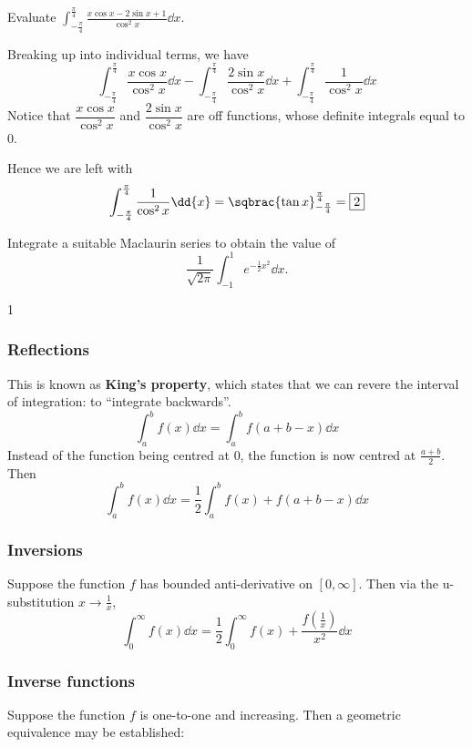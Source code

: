 \begin{exercise}
Evaluate $\displaystyle\int_{-\frac{\pi}{4}}^\frac{\pi}{4}\frac{x\cos x-2\sin x+1}{\cos^2x}\dd{x}$.
\end{exercise}
\begin{solution}
Breaking up into individual terms, we have
\[ \int_{-\frac{\pi}{4}}^\frac{\pi}{4}\frac{x\cos x}{\cos^2x}\dd{x}-\int_{-\frac{\pi}{4}}^\frac{\pi}{4}\frac{2\sin x}{\cos^2x}\dd{x}+\int_{-\frac{\pi}{4}}^\frac{\pi}{4}\frac{1}{\cos^2x}\dd{x} \]
Notice that $\dfrac{x\cos x}{\cos^2x}$ and $\dfrac{2\sin x}{\cos^2x}$ are off functions, whose definite integrals equal to $0$.

Hence we are left with 
\[ \int_{-\frac{\pi}{4}}^\frac{\pi}{4}\frac{1}{\cos^2x}\dd{x}=\sqbrac{\tan x}_{-\frac{\pi}{4}}^\frac{\pi}{4}=\boxed{2} \]
\end{solution}

\begin{exercise}
Integrate a suitable Maclaurin series to obtain the value of
\[ \frac{1}{\sqrt{2\pi}}\int_{-1}^1e^{-\frac{1}{2}x^2}\dd{x}. \]
\end{exercise}
\begin{solution}
1
\end{solution}

\subsubsection{Reflections}
This is known as \textbf{King's property}, which states that we can revere the interval of integration: to ``integrate backwards''.
\begin{equation}
\int_a^b f(x)\dd{x} = \int_a^b f(a+b-x)\dd{x}
\end{equation}
Instead of the function being centred at 0, the function is now centred at $\frac{a+b}{2}$. Then
\[ \int_a^b f(x)\dd{x} = \frac{1}{2} \int_a^b f(x) + f(a+b-x)\dd{x} \]

\subsubsection{Inversions}
Suppose the function $f$ has bounded anti-derivative on $[0,\infty]$. Then via the u-substitution $x\to\frac{1}{x}$,
\[ \int_0^\infty f(x)\dd{x} = \frac{1}{2}\int_0^\infty f(x) + \frac{f(\frac{1}{x})}{x^2}\dd{x} \]

\subsubsection{Inverse functions}
Suppose the function $f$ is one-to-one and increasing. Then a geometric equivalence may be established:


